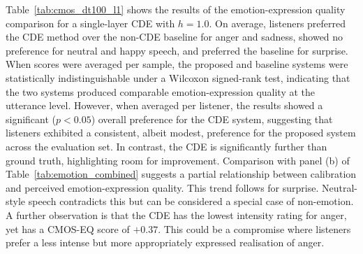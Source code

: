 Table~\ref{tab:cmos_dt100_l1} shows the results of the emotion-expression quality comparison for a single-layer \ac{CDE} with $h=1.0$. On average, listeners preferred the \ac{CDE} method over the non-CDE baseline for anger and sadness, showed no preference for neutral and happy speech, and preferred the baseline for surprise. When scores were averaged per sample, the proposed and baseline systems were statistically indistinguishable under a Wilcoxon signed-rank test, indicating that the two systems produced comparable emotion-expression quality at the utterance level. However, when averaged per listener, the results showed a significant ($p<0.05$) overall preference for the \ac{CDE} system, suggesting that listeners exhibited a consistent, albeit modest, preference for the proposed system across the evaluation set. In contrast, the \ac{CDE} is significantly further than ground truth, highlighting room for improvement. Comparison with panel (b) of Table~\ref{tab:emotion_combined} suggests a partial relationship between calibration and perceived emotion-expression quality. This trend follows for surprise. Neutral-style speech contradicts this but can be considered a special case of non-emotion. A further observation is that the \ac{CDE} has the lowest intensity rating for anger, yet has a CMOS-EQ score of $+0.37$. This could be a compromise where listeners prefer a less intense but more appropriately expressed realisation of anger.


